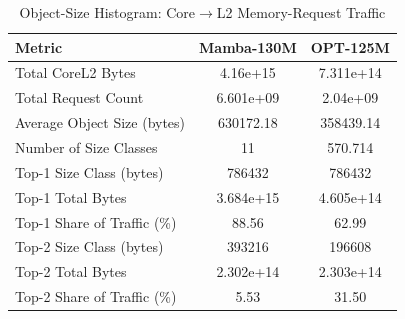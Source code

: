 \begin{table}[h]\centering
    \caption{Object-Size Histogram: Core$\rightarrow$L2 Memory-Request Traffic}
    \label{tab:object_histogram}
    \begin{tabular}{lcc}\hline
    Metric & Mamba-130M & OPT-125M \\\hline
        Total Core\textrightarrow{}L2 Bytes & 4.16e+15 & 7.311e+14 \\
    Total Request Count & 6.601e+09 & 2.04e+09 \\
    Average Object Size (bytes) & 630172.18 & 358439.14 \\
    Number of Size Classes & 11 & 570.714 \\
    Top-1 Size Class (bytes) & 786432 & 786432 \\
    Top-1 Total Bytes & 3.684e+15 & 4.605e+14 \\
    Top-1 Share of Traffic (\%) & 88.56 & 62.99 \\
    Top-2 Size Class (bytes) & 393216 & 196608 \\
    Top-2 Total Bytes & 2.302e+14 & 2.303e+14 \\
    Top-2 Share of Traffic (\%) & 5.53 & 31.50 \\
\hline\end{tabular}\end{table}